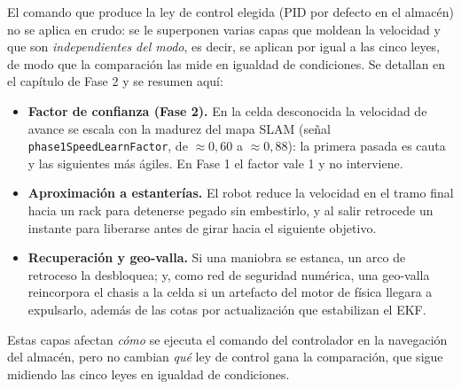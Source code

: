 El comando que produce la ley de control elegida (PID por defecto en el almacén) no
se aplica en crudo: se le superponen varias capas que moldean la velocidad y que son
\emph{independientes del modo}, es decir, se aplican por igual a las cinco leyes, de
modo que la comparación las mide en igualdad de condiciones. Se detallan en el
capítulo de Fase 2 y se resumen aquí:
\begin{itemize}
  \item \textbf{Factor de confianza (Fase 2).} En la celda desconocida la velocidad de
  avance se escala con la madurez del mapa SLAM (señal \texttt{phase1SpeedLearnFactor},
  de \(\approx 0{,}60\) a \(\approx 0{,}88\)): la primera pasada es cauta y las
  siguientes más ágiles. En Fase 1 el factor vale 1 y no interviene.
  \item \textbf{Aproximación a estanterías.} El robot reduce la velocidad en el tramo
  final hacia un rack para detenerse pegado sin embestirlo, y al salir retrocede un
  instante para liberarse antes de girar hacia el siguiente objetivo.
  \item \textbf{Recuperación y geo-valla.} Si una maniobra se estanca, un arco de
  retroceso la desbloquea; y, como red de seguridad numérica, una geo-valla reincorpora
  el chasis a la celda si un artefacto del motor de física llegara a expulsarlo, además
  de las cotas por actualización que estabilizan el EKF.
\end{itemize}
Estas capas afectan \emph{cómo} se ejecuta el comando del controlador en la navegación
del almacén, pero no cambian \emph{qué} ley de control gana la comparación, que sigue
midiendo las cinco leyes en igualdad de condiciones.
